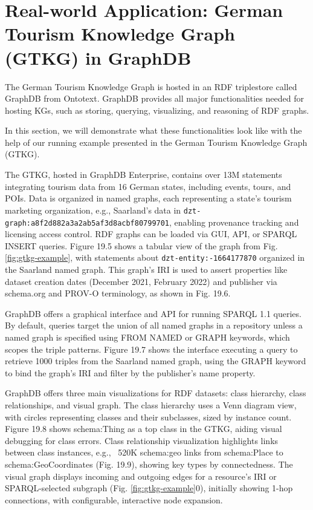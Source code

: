 \documentclass[12pt]{article}
\begin{document}
\section{Real-world Application: German Tourism Knowledge Graph (GTKG) in GraphDB}
The German Tourism Knowledge Graph is hosted in an RDF triplestore called GraphDB from Ontotext. GraphDB provides all major functionalities needed for hosting KGs, such as storing, querying, visualizing, and reasoning of RDF graphs.

In this section, we will demonstrate what these functionalities look like with the help of our running example presented in the German Tourism Knowledge Graph (GTKG).

The GTKG, hosted in GraphDB Enterprise, contains over 13M statements integrating tourism data from 16 German states, including events, tours, and POIs. Data is organized in named graphs, each representing a state’s tourism marketing organization, e.g., Saarland’s data in \verb|dzt-graph:a8f2d882a3a2ab5af3d8acbf80799701|, enabling provenance tracking and licensing access control. RDF graphs can be loaded via GUI, API, or SPARQL INSERT queries. Figure 19.5 shows a tabular view of the graph from Fig. \ref{fig:gtkg-example}, with statements about \verb|dzt-entity:-1664177870| organized in the Saarland named graph. This graph’s IRI is used to assert properties like dataset creation dates (December 2021, February 2022) and publisher via schema.org and PROV-O terminology, as shown in Fig. 19.6.

GraphDB offers a graphical interface and API for running SPARQL 1.1 queries. By default, queries target the union of all named graphs in a repository unless a named graph is specified using FROM NAMED or GRAPH keywords, which scopes the triple patterns. Figure 19.7 shows the interface executing a query to retrieve 1000 triples from the Saarland named graph, using the GRAPH keyword to bind the graph’s IRI and filter by the publisher’s name property.

GraphDB offers three main visualizations for RDF datasets: class hierarchy, class relationships, and visual graph. The class hierarchy uses a Venn diagram view, with circles representing classes and their subclasses, sized by instance count. Figure 19.8 shows schema:Thing as a top class in the GTKG, aiding visual debugging for class errors. Class relationship visualization highlights links between class instances, e.g., ~520K schema:geo links from schema:Place to schema:GeoCoordinates (Fig. 19.9), showing key types by connectedness. The visual graph displays incoming and outgoing edges for a resource’s IRI or SPARQL-selected subgraph (Fig. \ref{fig:gtkg-example}0), initially showing 1-hop connections, with configurable, interactive node expansion.
\end{document}
